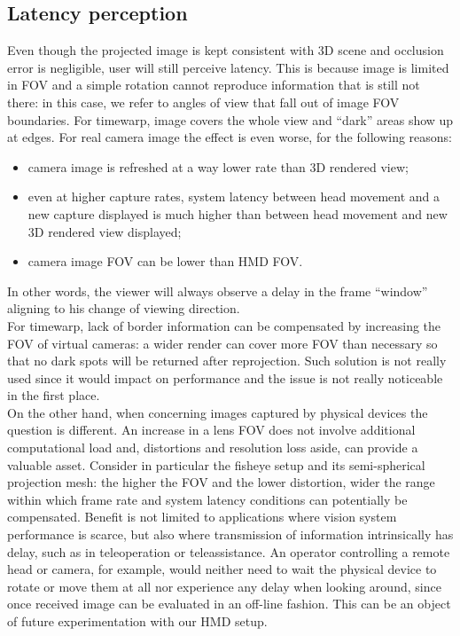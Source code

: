 \subsection{Latency perception}
Even though the projected image is kept consistent with 3D scene and occlusion error is negligible, user will still perceive latency. This is because image is limited in FOV and a simple rotation cannot reproduce information that is still not there: in this case, we refer to angles of view that fall out of image FOV boundaries. For timewarp, image covers the whole view and “dark” areas show up at edges. For real camera image the effect is even worse, for the following reasons:
\begin{itemize}
\item camera image is refreshed at a way lower rate than 3D rendered view;
\item even at higher capture rates, system latency between head movement and a new capture displayed is much higher than between head movement and new 3D rendered view displayed;
\item camera image FOV can be lower than HMD FOV.
\end{itemize}
In other words, the viewer will always observe a delay in the frame “window” aligning to his change of viewing direction.\\
For timewarp, lack of border information can be compensated by increasing the FOV of virtual cameras: a wider render can cover more FOV than necessary so that no dark spots will be returned after reprojection. Such solution is not really used since it would impact on performance and the issue is not really noticeable in the first place.\\
On the other hand, when concerning images captured by physical devices the question is different. An increase in a lens FOV does not involve additional computational load and, distortions and resolution loss aside, can provide a valuable asset. Consider in particular the fisheye setup and its semi-spherical projection mesh: the higher the FOV and the lower distortion, wider the range within which frame rate and system latency conditions can potentially be compensated. Benefit is not limited to applications where vision system performance is scarce, but also where transmission of information intrinsically has delay, such as in teleoperation or teleassistance. An operator controlling a remote head or camera, for example, would neither need to wait the physical device to rotate or move them at all nor experience any delay when looking around, since once received image can be evaluated in an off-line fashion. This can be an object of future experimentation with our HMD setup.\\
